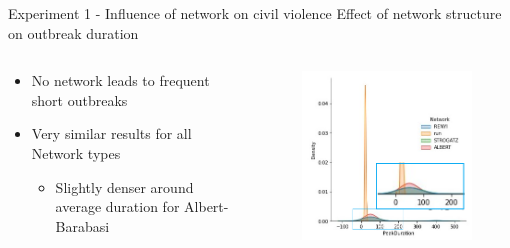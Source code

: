 \documentclass[10pt]{beamer}
\begin{document}
    \begin{frame}{Experiment 1 - Influence of network on civil violence}
        \large Effect of network structure on outbreak duration
        \begin{columns}
            \begin{column}{.4\textwidth}
                \begin{itemize}
                    \item No network leads to frequent short outbreaks
                    \item Very similar results for all Network types
                    \begin{itemize}
                        \item Slightly denser around average duration for Albert-Barabasi
                    \end{itemize}
                \end{itemize}
            \end{column}
            \begin{column}{.6\textwidth}
                \begin{figure}
                    \centering
                    \includegraphics[width=.9\textwidth]{pictures/network_comparison/duration_comparison.png}
                \end{figure}
            \end{column}
        \end{columns}
    \end{frame}
\end{document}
